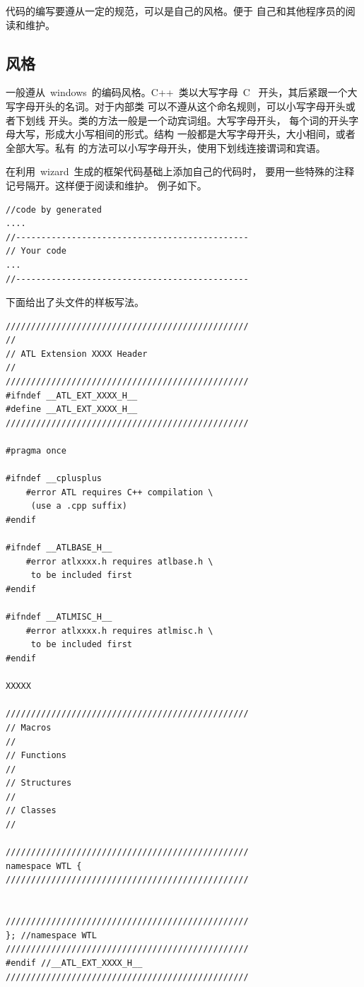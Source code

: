 代码的编写要遵从一定的规范，可以是自己的风格。便于
自己和其他程序员的阅读和维护。

\subsection{风格}

一般遵从~windows~的编码风格。C++~类以大写字母~C~
开头，其后紧跟一个大写字母开头的名词。对于内部类
可以不遵从这个命名规则，可以小写字母开头或者下划线
开头。类的方法一般是一个动宾词组。大写字母开头，
每个词的开头字母大写，形成大小写相间的形式。结构
一般都是大写字母开头，大小相间，或者全部大写。私有
的方法可以小写字母开头，使用下划线连接谓词和宾语。

在利用~wizard~生成的框架代码基础上添加自己的代码时，
要用一些特殊的注释记号隔开。这样便于阅读和维护。
例子如下。
\ttfamily
\begin{lstlisting}
//code by generated
....
//----------------------------------------------
// Your code
...
//----------------------------------------------
\end{lstlisting}

下面给出了头文件的样板写法。
\ttfamily
\begin{lstlisting}
////////////////////////////////////////////////
//
// ATL Extension XXXX Header
//
////////////////////////////////////////////////
#ifndef __ATL_EXT_XXXX_H__
#define __ATL_EXT_XXXX_H__
////////////////////////////////////////////////

#pragma once

#ifndef __cplusplus
	#error ATL requires C++ compilation \
     (use a .cpp suffix)
#endif

#ifndef __ATLBASE_H__
	#error atlxxxx.h requires atlbase.h \
     to be included first
#endif

#ifndef __ATLMISC_H__
	#error atlxxxx.h requires atlmisc.h \
     to be included first
#endif

XXXXX

////////////////////////////////////////////////
// Macros
//
// Functions
//
// Structures
//
// Classes
//

////////////////////////////////////////////////
namespace WTL {
////////////////////////////////////////////////


////////////////////////////////////////////////
}; //namespace WTL
////////////////////////////////////////////////
#endif //__ATL_EXT_XXXX_H__
////////////////////////////////////////////////
\end{lstlisting}
\CJKfamily{song}

